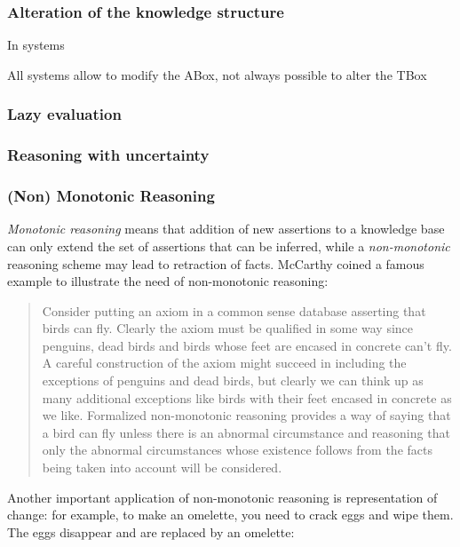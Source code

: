 \subsubsection{Alteration of the knowledge structure}

In systems

All systems allow to modify the ABox, not always possible to alter the TBox


\subsubsection{Lazy evaluation}
\label{sect|lazy-evaluation}


\subsubsection{Reasoning with uncertainty}


\subsubsection{(Non) Monotonic Reasoning}

\emph{Monotonic reasoning} means that addition of new assertions to a knowledge base
can only extend the set of assertions that can be inferred, while a
\emph{non-monotonic} reasoning scheme may lead to retraction of facts.
McCarthy coined a famous example to illustrate the need of non-monotonic reasoning:

\begin{quotation}
Consider putting an axiom in a common sense database asserting that birds can
fly. Clearly the axiom must be qualified in some way since penguins, dead birds
and birds whose feet are encased in concrete can't fly. A careful construction
of the axiom might succeed in including the exceptions of penguins and dead
birds, but clearly we can think up as many additional exceptions like birds
with their feet encased in concrete as we like. Formalized non-monotonic
reasoning provides a way of saying that a bird can fly unless there
is an abnormal circumstance and reasoning that only the abnormal circumstances
whose existence follows from the facts being taken into account will be
considered.
\end{quotation}

Another important application of non-monotonic reasoning is representation of
change: for example, to make an omelette, you need to crack eggs and wipe them.
The eggs disappear and are replaced by an omelette:

